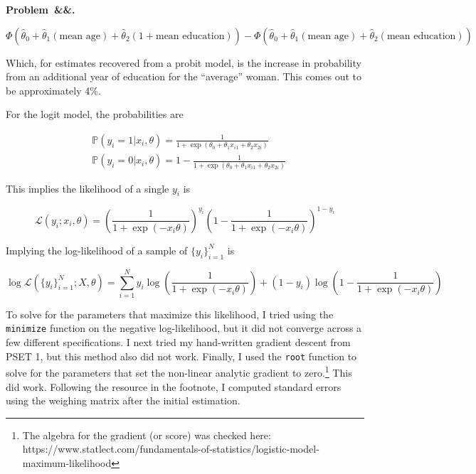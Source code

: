 \documentclass[12pt]{article}
\newcommand{\prob}{\mathbb{P}}
\newcounter{problem}
\newenvironment{problem}[1][]{
    \newpage %
    \refstepcounter{problem}\par\noindent
    \textbf{Problem~\theproblem\ifx&#1&\else.~#1\fi}\rmfamily\par\vspace{0.5em}
}{\vspace{1em}}
\begin{document}
\begin{problem}
\begin{subproblems}
    \[
    \Phi(\hat\theta_0 + \hat\theta_1(\text{mean age}) + \hat\theta_2(1 + \text{mean education})) - 
    \Phi(\hat\theta_0 + \hat\theta_1(\text{mean age}) + \hat\theta_2(\text{mean education}))
    \]

    Which, for estimates recovered from a probit model, is the increase in probability from an additional year of education for the ``average'' woman. This comes out to be approximately 4\%. 

    \item For the logit model, the probabilities are 
    
    \begin{align*}
        &\prob(y_i = 1 | x_i, \theta) = \frac{1}{1 + \exp(\theta_0 + \theta_1 x_{i1} + \theta_2 x_{2i})} \\
        & \prob(y_i = 0 | x_i, \theta) = 1 - \frac{1}{1 + \exp(\theta_0 + \theta_1 x_{i1} + \theta_2 x_{2i})}
    \end{align*}

    This implies the likelihood of a single $y_i$ is 

    \[
    \mathscr{L}(y_i; x_i, \theta) = 
    \left(\frac{1}{1 + \exp(-x_i\theta)}\right)^{y_i}
    \left(1 - \frac{1}{1 + \exp(-x_i\theta)}\right)^{1 - y_i}
    \]

    Implying the log-likelihood of a sample of $\{y_i\}_{i=1}^N$ is 

    \[
    \log \mathscr{L}(\{y_i\}_{i=1}^N; X, \theta) = \sum_{i=1}^{N}y_i\log\left(\frac{1}{1 + \exp(-x_i\theta)}\right) + (1 - y_i) \log\left(1 - \frac{1}{1 + \exp(-x_i\theta)}\right)
    \]

    To solve for the parameters that maximize this likelihood, I tried using the \texttt{minimize} function on the negative log-likelihood, but it did not converge across a few different specifications. I next tried my hand-written gradient descent from PSET 1, but this method also did not work. Finally, I used the \texttt{root} function to solve for the parameters that set the non-linear analytic gradient to zero.\footnote{The algebra for the gradient (or score) was checked here: https://www.statlect.com/fundamentals-of-statistics/logistic-model-maximum-likelihood} This did work. Following the resource in the footnote, I computed standard errors using the weighing matrix after the initial estimation. 

    \begin{table}[H]
        \centering 
        \caption{Logit Estimates}
        \label{tab:logit}
        
    \end{table}
    

\end{subproblems}
\end{problem}
\end{document}
